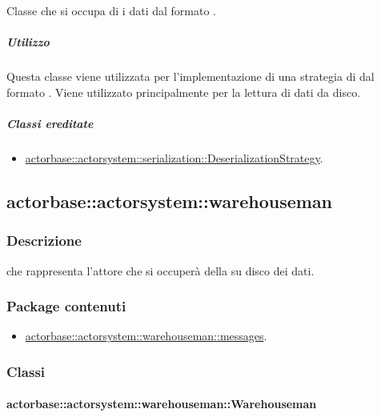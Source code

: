 \documentclass{scalatekids-article}
\begin{document}
Classe che si occupa di  i dati dal formato .

\subparagraph{Utilizzo}

Questa classe viene utilizzata per l'implementazione di una strategia di
 dal formato . Viene utilizzato
principalmente per la lettura di dati da disco.

\subparagraph{Classi ereditate}

\begin{itemize}

\item \hyperref[sec:actorbase::actorsystem::serialization::DeserializationStrategy]{actorbase::actorsystem::serialization::DeserializationStrategy}.

\end{itemize}

\subsection{actorbase::actorsystem::warehouseman}
\label{sec:actorbase::actorsystem::warehouseman}

\subsubsection{Descrizione}

 che rappresenta l'attore che si occuperà della
 su disco dei dati.

\subsubsection{Package contenuti}

\begin{itemize}

\item \hyperref[sec:actorbase::actorsystem::warehouseman::messages]{actorbase::actorsystem::warehouseman::messages}.

\end{itemize}

\subsubsection{Classi}

\paragraph{actorbase::actorsystem::warehouseman::Warehouseman}
\label{sec:actorbase::actorsystem::warehouseman::Warehouseman}
\end{document}
